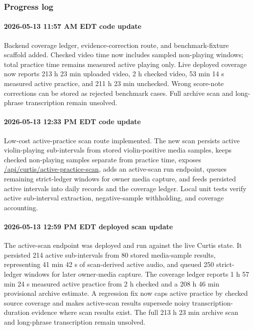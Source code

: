 \subsubsection*{Progress log}

\paragraph{2026-05-13 11:57 AM EDT code update} Backend coverage ledger, evidence-correction route, and benchmark-fixture scaffold added. Checked video time now includes sampled non-playing windows; total practice time remains measured active playing only. Live deployed coverage now reports 213 h 23 min uploaded video, 2 h checked video, 53 min 14 s measured active practice, and 211 h 23 min unchecked. Wrong score-note corrections can be stored as rejected benchmark cases. Full archive scan and long-phrase transcription remain unsolved.
\paragraph{2026-05-13 12:33 PM EDT code update} Low-cost active-practice scan route implemented. The new scan persists active violin-playing sub-intervals from stored violin-positive media samples, keeps checked non-playing samples separate from practice time, exposes \url{/api/curtis/active-practice-scan}, adds an active-scan run endpoint, queues remaining strict-ledger windows for owner media capture, and feeds persisted active intervals into daily records and the coverage ledger. Local unit tests verify active sub-interval extraction, negative-sample withholding, and coverage accounting.
\paragraph{2026-05-13 12:59 PM EDT deployed scan update} The active-scan endpoint was deployed and run against the live Curtis state. It persisted 214 active sub-intervals from 80 stored media-sample results, representing 41 min 42 s of scan-derived active audio, and queued 250 strict-ledger windows for later owner-media capture. The coverage ledger reports 1 h 57 min 24 s measured active practice from 2 h checked and a 208 h 46 min provisional archive estimate. A regression fix now caps active practice by checked source coverage and makes active-scan results supersede noisy transcription-duration evidence where scan results exist. The full 213 h 23 min archive scan and long-phrase transcription remain unsolved.
